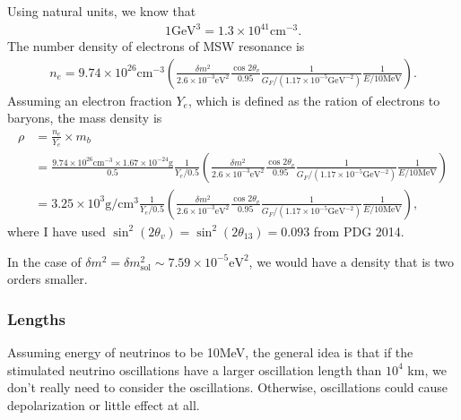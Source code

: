 \documentclass[letterpaper,12pt,english]{sphinxmanual}
\begin{document}
Using natural units, we know that
\begin{equation*}
\begin{split}1\mathrm{GeV^3} = 1.3\times 10^{41} \mathrm{cm^{-3}}.\end{split}
\end{equation*}
The number density of electrons of MSW resonance is
\begin{equation*}
\begin{split}n_e = 9.74\times 10^{26}\mathrm{cm^{-3}} \left(  \frac{\delta m^2}{2.6\times 10^{-3}\mathrm{eV^2}} \frac{\cos 2\theta_v}{0.95} \frac{1}{G_F/(1.17\times 10^{-5}\mathrm{GeV^{-2}})} \frac{1}{E/10\mathrm{MeV}} \right).\end{split}
\end{equation*}
Assuming an electron fraction \(Y_e\), which is defined as the ration of electrons to baryons, the mass density is
\begin{equation*}
\begin{split}\rho &= \frac{n_e}{Y_e} \times m_b \\
& = \frac{ 9.74\times 10^{26} \mathrm{cm^{-3}} \times 1.67\times 10^{-24} \mathrm{g} }{ 0.5 } \frac{1}{ Y_e/0.5 } \left(  \frac{\delta m^2}{2.6\times 10^{-3}\mathrm{eV^2}} \frac{\cos 2\theta_v}{0.95} \frac{1}{G_F/(1.17\times 10^{-5}\mathrm{GeV^{-2}})} \frac{1}{E/10\mathrm{MeV}} \right)\\
& =  3.25\times 10^3 \mathrm{g/cm^3} \frac{1}{ Y_e/0.5 } \left(  \frac{\delta m^2}{2.6\times 10^{-3}\mathrm{eV^2}} \frac{\cos 2\theta_v}{0.95} \frac{1}{G_F/(1.17\times 10^{-5}\mathrm{GeV^{-2}})} \frac{1}{E/10\mathrm{MeV}} \right),\end{split}
\end{equation*}
where I have used \(\sin^2(2\theta_v) = \sin^2(2\theta_{13})=0.093\) from PDG 2014.

In the case of \(\delta m^2 = \delta m^2_{\mathrm{sol}} \sim 7.59\times 10^{-5}\mathrm{eV^2}\), we would have a density that is two orders smaller.


\subsubsection{Lengths}
\label{\detokenize{matter-stimulated/scales:lengths}}
Assuming energy of neutrinos to be 10MeV, the general idea is that if the stimulated neutrino oscillations have a larger oscillation length than \(10^4\) km, we don't really need to consider the oscillations. Otherwise, oscillations could cause depolarization or little effect at all.
\end{document}
